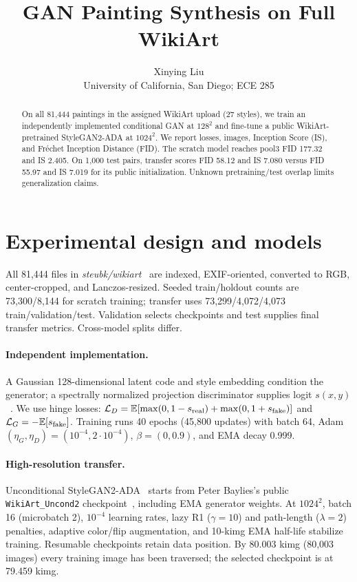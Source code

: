 \documentclass{article}
\title{GAN Painting Synthesis on Full WikiArt}
\author{Xinying Liu\\University of California, San Diego; ECE 285}
\begin{document}
\maketitle

\begin{abstract}
On all 81,444 paintings in the assigned WikiArt upload (27 styles), we train an independently implemented conditional GAN at $128^2$ and fine-tune a public WikiArt-pretrained StyleGAN2-ADA at $1024^2$. We report losses, images, Inception Score (IS), and Fr\'echet Inception Distance (FID). The scratch model reaches pool3 FID 177.32 and IS 2.405. On 1,000 test pairs, transfer scores FID 58.12 and IS 7.080 versus FID 55.97 and IS 7.019 for its public initialization. Unknown pretraining/test overlap limits generalization claims.
\end{abstract}

\section{Experimental design and models}
All 81,444 files in \emph{steubk/wikiart}~\cite{wikiart} are indexed, EXIF-oriented, converted to RGB, center-cropped, and Lanczos-resized. Seeded train/holdout counts are 73,300/8,144 for scratch training; transfer uses 73,299/4,072/4,073 train/validation/test. Validation selects checkpoints and test supplies final transfer metrics. Cross-model splits differ.

\paragraph{Independent implementation.} A Gaussian 128-dimensional latent code and style embedding condition the generator; a spectrally normalized projection discriminator supplies logit $s(x,y)$~\cite{goodfellow,miyatoProjection,miyatoSpectral}. We use hinge losses: $\mathcal L_D=\mathbb E[\max(0,1-s_{\rm real})+\max(0,1+s_{\rm fake})]$ and $\mathcal L_G=-\mathbb E[s_{\rm fake}]$.
Training runs 40 epochs (45,800 updates) with batch 64, Adam $(\eta_G,\eta_D)=(10^{-4},2\cdot10^{-4})$, $\beta=(0,0.9)$, and EMA decay 0.999.

\paragraph{High-resolution transfer.} Unconditional StyleGAN2-ADA~\cite{karrasStylegan2,karrasADA} starts from Peter Baylies's public \texttt{WikiArt\_Uncond2} checkpoint~\cite{baylies}, including EMA generator weights. At $1024^2$, batch 16 (microbatch 2), $10^{-4}$ learning rates, lazy R1 ($\gamma=10$) and path-length ($\lambda=2$) penalties, adaptive color/flip augmentation, and 10-kimg EMA half-life stabilize training. Resumable checkpoints retain data position. By 80.003 kimg (80,003 images) every training image has been traversed; the selected checkpoint is at 79.459 kimg.
\end{document}
